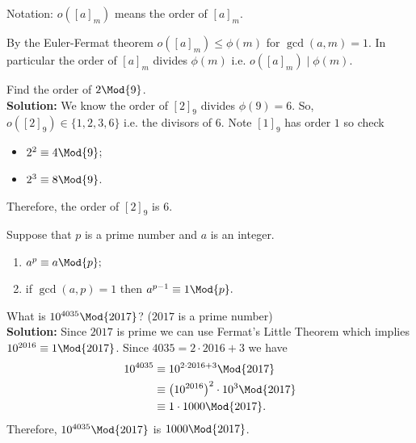 \documentclass[12pt, a4paper]{article}
\begin{document}
\begin{mdnote}
    Notation: \(o\left( [a]_m \right)\) means the order of \([a]_m\).
\end{mdnote}

\begin{corollary}
    By the Euler-Fermat theorem \(o([a]_m) \leq \phi(m)\) for \(\gcd(a,m)=1\). In particular the order of \([a]_m\) divides \(\phi(m)\) i.e. \(o([a]_m) \mid \phi(m)\).
\end{corollary}

\begin{example}
    Find the order of \(2 \Mod{9}\). \\
    \textbf{Solution:} We know the order of \([2]_9\) divides \(\phi(9)=6\). So, \(o([2]_9) \in \{1,2,3,6\}\) i.e. the divisors of \(6\). Note \([1]_9\) has order \(1\) so check 
    \begin{itemize}
        \item \(2^2 \equiv 4 \Mod{9}\);
        \item \(2^3 \equiv 8 \Mod{9}\).
    \end{itemize}
    Therefore, the order of \([2]_9\) is \(6\).
\end{example}

\begin{mdcor}
    Suppose that $p$ is a prime number and $a$ is an integer.
    \begin{enumerate}
        \item $a^p \equiv a \Mod{p};$
        \item if \(\gcd(a,p)=1\) then $a^{p-1} \equiv 1 \Mod{p}.$
    \end{enumerate}
\end{mdcor}

\begin{mdexample}
    What is \(10^{4035} \Mod{2017}\)? (\(2017\) is a prime number) \\
    \textbf{Solution:} Since \(2017\) is prime we can use Fermat's Little Theorem which implies \(10^{2016} \equiv 1 \Mod{2017}\). Since \(4035 = 2\cdot 2016 +3\) we have 
    \[\begin{aligned}
        10^{4035} &\equiv 10^{2\cdot 2016 +3} \Mod{2017} \\
                &\equiv \left( 10^{2016} \right)^2 \cdot 10^3 \Mod{2017}\\
                &\equiv 1\cdot 1000 \Mod{2017}.
    \end{aligned}\]
    Therefore, \(10^{4035} \Mod{2017}\) is \(1000 \Mod{2017}\).
\end{mdexample}
\end{document}

